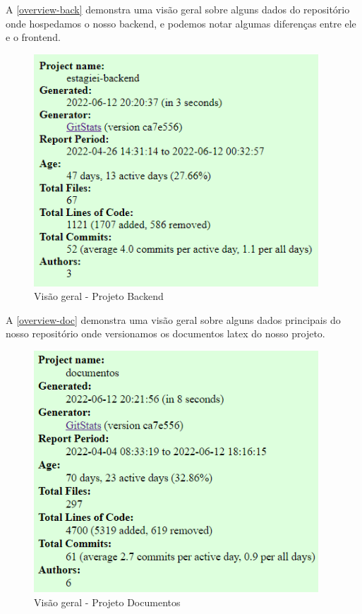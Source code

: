 A \autoref{overview-back} demonstra uma visão geral sobre alguns dados do repositório onde hospedamos o nosso backend, e podemos notar algumas diferenças entre ele e o \gls{frontend}.
\begin{figure}[H]
	\centering
	\caption{\label{overview-back}Visão geral - Projeto Backend}
	\includegraphics[width=0.95\textwidth]{../imagens/stats/overview-backend.png}
\end{figure}

A \autoref{overview-doc} demonstra uma visão geral sobre alguns dados principais do nosso repositório onde versionamos os documentos latex do nosso projeto.
\begin{figure}[H]
	\centering
	\caption{\label{overview-doc}Visão geral - Projeto Documentos}
	\includegraphics[width=0.95\textwidth]{../imagens/stats/overview-documentos.png}
\end{figure}

